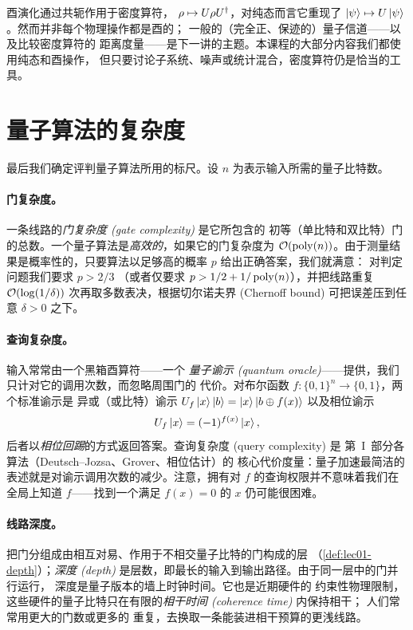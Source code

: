 酉演化通过共轭作用于密度算符，
$\rho\mapsto U\rho U^{\dagger}$，对纯态而言它重现了
$\ket{\psi}\mapsto U\ket{\psi}$。然而并非每个物理操作都是酉的；
一般的（完全正、保迹的）量子信道——以及比较密度算符的
距离度量——是下一讲的主题。本课程的大部分内容我们都使用纯态和酉操作，
但只要讨论子系统、噪声或统计混合，密度算符仍是恰当的工具。

\section{量子算法的复杂度}
\label{sec:lec01-6}

最后我们确定评判量子算法所用的标尺。设 $n$ 为表示输入所需的量子比特数。

\paragraph{门复杂度。} 一条线路的\emph{门复杂度 (gate complexity)} 是它所包含的
初等（单比特和双比特）门的总数。一个量子算法是\emph{高效的}，如果它的门复杂度为
$\mathcal{O}(\operatorname{poly}(n))$。由于测量结果是概率性的，只要算法以足够高的概率 $p$ 给出正确答案，我们就满意：
对判定问题我们要求 $p>2/3$
（或者仅要求 $p>1/2+1/\operatorname{poly}(n)$），并把线路重复 $\mathcal{O}(\log(1/\delta))$
次再取多数表决，根据切尔诺夫界 (Chernoff bound) 可把误差压到任意 $\delta>0$ 之下。

\paragraph{查询复杂度。} 输入常常由一个黑箱酉算符——一个
\emph{量子谕示 (quantum oracle)}——提供，我们只计对它的调用次数，而忽略周围门的
代价。对布尔函数 $f:\{0,1\}^{n}\to\{0,1\}$，两个标准谕示是
异或（或比特）谕示 $U_{f}\ket{x}\ket{b}=\ket{x}\ket{b\oplus f(x)}$
以及相位谕示
\begin{equation}
  U_{f}\ket{x}=(-1)^{f(x)}\ket{x},
\end{equation}
后者以\emph{相位回踢}的方式返回答案。查询复杂度 (query complexity) 是
第~I~部分各算法（Deutsch--Jozsa、Grover、相位估计）的
核心代价度量：量子加速最简洁的表述就是对谕示调用次数的减少。注意，拥有对 $f$
的查询权限并不意味着我们在全局上知道 $f$——找到一个满足 $f(x)=0$ 的 $x$ 仍可能很困难。

\paragraph{线路深度。} 把门分组成由相互对易、作用于不相交量子比特的门构成的层
（\cref{def:lec01-depth}）；\emph{深度 (depth)} 是层数，即最长的输入到输出路径。由于同一层中的门并行运行，
深度是量子版本的墙上时钟时间。它也是近期硬件的
约束性物理限制，这些硬件的量子比特只在有限的\emph{相干时间 (coherence time)} 内保持相干；
人们常常用更大的门数或更多的
重复，去换取一条能装进相干预算的更浅线路。

